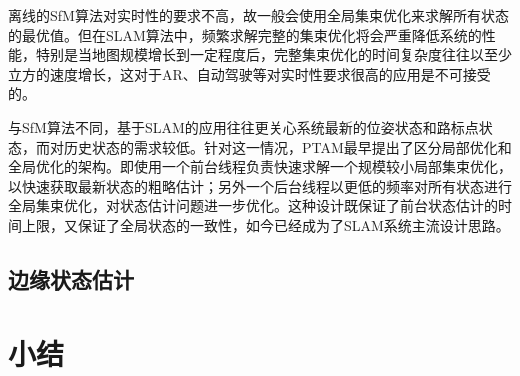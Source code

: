 离线的SfM算法对实时性的要求不高，故一般会使用全局集束优化来求解所有状态的最优值。但在SLAM算法中，频繁求解完整的集束优化将会严重降低系统的性能，特别是当地图规模增长到一定程度后，完整集束优化的时间复杂度往往以至少立方的速度增长，这对于AR、自动驾驶等对实时性要求很高的应用是不可接受的。

与SfM算法不同，基于SLAM的应用往往更关心系统最新的位姿状态和路标点状态，而对历史状态的需求较低。针对这一情况，PTAM\citep{klein2007parallel}最早提出了区分局部优化和全局优化的架构。即使用一个前台线程负责快速求解一个规模较小局部集束优化，以快速获取最新状态的粗略估计；另外一个后台线程以更低的频率对所有状态进行全局集束优化，对状态估计问题进一步优化。这种设计既保证了前台状态估计的时间上限，又保证了全局状态的一致性，如今已经成为了SLAM系统主流设计思路。

\subsection{边缘状态估计}

\section{小结}
